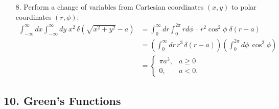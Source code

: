 \documentclass[10pt,a4paper]{article}
\begin{document}
\begin{enumerate}
\item[8.]
Perform a change of variables from Cartesian coordinates $(x,y)$ to
polar coordinates $(r,\phi)$:
\begin{align}
   \int_{-\infty}^\infty dx \int_{-\infty}^\infty dy \; x^2\, \delta\left(\sqrt{x^2+y^2}-a\right) &= \int_0^{\infty} dr \int_{0}^{2\pi} rd\phi\, \cdot\, r^2\cos^2\phi\; \delta(r-a) \\
  &= \left(\int_0^{\infty} dr \, r^3\, \delta(r-a)\right) \left(\int_{0}^{2\pi}\!d\phi \, \cos^2\phi\right) \\
  &= \begin{cases}\pi a^3, & a \ge 0 \\ 0, & a < 0.\end{cases} 
\end{align}
\end{enumerate}

\subsection*{10. Green's Functions}
\end{document}

